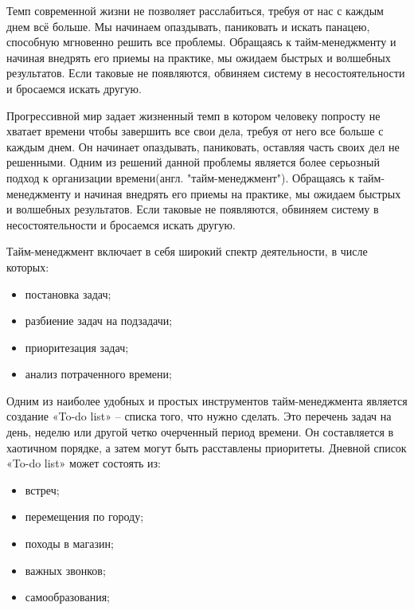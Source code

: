 \label{sec:intro}

Темп современной жизни не позволяет расслабиться, требуя от нас с каждым днем всё больше. Мы начинаем опаздывать, паниковать и искать панацею, способную мгновенно решить все проблемы. Обращаясь к тайм-менеджменту и начиная внедрять его приемы на практике, мы ожидаем быстрых и волшебных результатов. Если таковые не появляются, обвиняем систему в несостоятельности и бросаемся искать другую.

Прогрессивной мир задает жизненный темп в котором человеку попросту не хватает времени чтобы завершить все свои дела, требуя от него все больше с каждым днем. Он начинает опаздывать, паниковать, оставляя часть своих дел не решенными. Одним из решений данной проблемы является более серьозный подход к организации времени(англ. "тайм-менеджмент"). Обращаясь к тайм-менеджменту и начиная внедрять его приемы на практике, мы ожидаем быстрых и волшебных результатов. Если таковые не появляются, обвиняем систему в несостоятельности и бросаемся искать другую.

Тайм-менеджмент включает в себя широкий спектр деятельности, в числе которых:
\begin{itemize}
	\item постановка задач;
	\item разбиение задач на подзадачи;
	\item приоритезация задач;
	\item анализ потраченного времени;
\end{itemize}

Одним из наиболее удобных и простых инструментов тайм-менеджмента является создание «To-do list» – списка того, что нужно сделать. Это перечень задач на день, неделю или другой четко очерченный период времени. Он составляется в хаотичном порядке, а затем могут быть расставлены приоритеты.
Дневной список «To-do list» может состоять из:
\begin{itemize}
	\item встреч;
	\item перемещения по городу;
	\item походы в магазин;
	\item важных звонков;
	\item самообразования;
\end{itemize}


